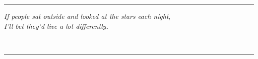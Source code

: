 \mbox{}
\vspace{.75in}
\hrule

\vspace{2in}


\begin{centering}
	\hspace{.25in}
	\parbox{5in}{
		\noindent
		\textit{If people sat outside and looked at the stars each night,\\I'll bet they'd live a lot differently.}
		\vspace{3pt}

		\begin{flushright}
			{}\\
		\end{flushright}
	}
\end{centering}
\vspace{2.25in}
\hrule
\vfill

\textwidth 5.750in \textheight=8.50in \headheight 0.0625in \topmargin 0.0in %
